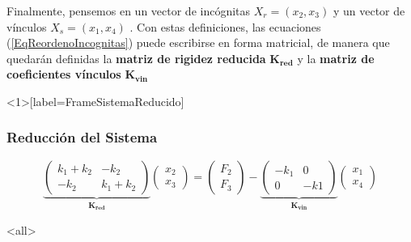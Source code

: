 Finalmente, pensemos en un vector de incógnitas $X_r = (x_2, x_3)$   y un
vector de vínculos $X_s  = (x_1, x_4)$ . Con estas definiciones, las
ecuaciones (\ref{EqReordenoIncognitas})  puede escribirse en forma matricial, de manera que
  quedarán definidas la \textbf{matriz de rigidez reducida} $\mathbf{K_{red} }$ 
  y la \textbf{matriz de coeficientes vínculos} $\mathbf{K_{vin}}$

\mode*



  \begin{frame}<1>[label=FrameSistemaReducido]
    \frametitle<presentation>{Reducción del Sistema}
    \begin{equation}\label{EqSistemaReducido}
      \underbrace{
	\begin{pmatrix} k_1 + k_2 & - k_2 \\ -k_2 & k_1 + k_2 \end{pmatrix}
	}_{ \mathbf{K_{red} } }
	\begin{pmatrix}x_2 \\ x_3\end{pmatrix}
	  = 
	  \begin{pmatrix}F_2 \\ F_3\end{pmatrix}
	    -
	  \underbrace{
	      \begin{pmatrix} -k_1 & 0 \\ 0 & -k1 \end{pmatrix}
	   }_{ \mathbf{ K_{vin} } }
	\begin{pmatrix}x_1 \\ x_4\end{pmatrix}
    \end{equation}

  \end{frame}

\mode<all>
